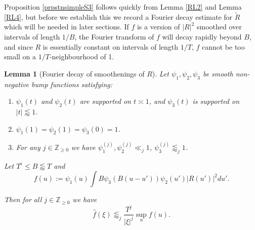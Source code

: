 \documentclass{amsart}
\theoremstyle{plain}
\newtheorem{lmm}[thrm]{Lemma}
\numberwithin{equation}{section}
\renewcommand{\tilde}{\widetilde}
\begin{document}
Proposition \ref{prpstnsimpleS3} follows quickly from Lemma \ref{RL2} and Lemma \ref{RL4}, but before we establish this we record a Fourier decay estimate for $\tilde{R}$ which will be needed in later sections. If $f$ is a version of $|R|^2$ smoothed over intervals of length $1/B$,  the Fourier transform of $f$ will decay rapidly beyond $B$, and since $R$ is essentially constant on intervals of length $1/T$, $f$ cannot be too small on a $1/T$-neighbourhood of 1.

\begin{lmm}[Fourier decay of smoothenings of $R$]\label{lmm:SmoothedFourierDecay}
Let $\psi_1,\psi_2,\psi_3$ be smooth non-negative bump functions satisfying:
\begin{enumerate}
\item $\psi_1(t)$ and $\psi_2(t)$ are supported on $t\asymp 1$, and $\psi_3(t)$ is supported on $|t|\lessapprox 1$.
\item $\psi_1(1)=\psi_2(1)=\psi_3(0)=1$.
\item For any $j\in \mathbb{Z}_{\ge 0}$ we have $\psi_1^{(j)},\psi_2^{(j)}\ll_j 1$, $\psi_3^{(j)}\lessapprox_j 1$.
\end{enumerate}
Let $T^\epsilon\le B\lessapprox T$ and
\[
f(u) := \psi_1(u)  \int B \psi_3(B (u - u')) \psi_2(u')|R(u')|^2 du'.
\]

Then for all $j\in\mathbb{Z}_{\ge 0}$ we have
\[\widehat{f}(\xi)\lessapprox_j \frac{T^j}{|\xi|^j}\sup_uf(u).\]
\end{lmm}
\end{document}
